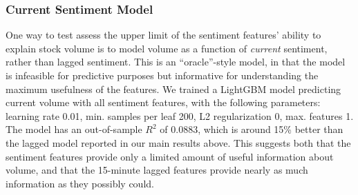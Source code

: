 \documentclass[12pt]{article}
\begin{document}
\subsubsection{Current Sentiment Model}
\label{section:appendix_sentiment}
One way to test assess the upper limit of the sentiment features' ability to explain stock volume is to model volume as a function of \textit{current} sentiment, rather than lagged sentiment. This is an ``oracle''-style model, in that the model is infeasible for predictive purposes but informative for understanding the maximum usefulness of the features. We trained a LightGBM model predicting current volume with all sentiment features, with the following parameters: learning rate 0.01, min. samples per leaf 200, L2 regularization 0, max. features 1. The model has an out-of-sample $R^2$ of 0.0883, which is around 15\% better than the lagged model reported in our main results above. This suggests both that the sentiment features provide only a limited amount of useful information about volume, and that the 15-minute lagged features provide nearly as much information as they possibly could.
\end{document}
